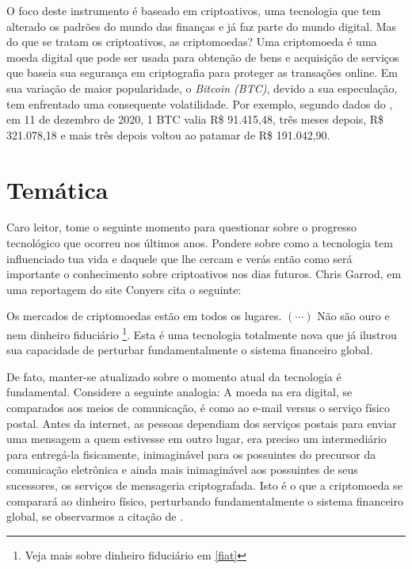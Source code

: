 O foco deste instrumento é baseado em criptoativos, uma tecnologia que tem alterado os padrões do mundo das finanças e já faz parte do mundo digital. Mas do que se tratam os criptoativos, as criptomoedas? Uma criptomoeda é uma moeda digital que pode ser usada para obtenção de bens e acquisição de serviços que baseia sua segurança em  criptografia para proteger as transações online. Em sua variação de maior popularidade, o  \textit{Bitcoin (BTC)}, devido a sua especulação, tem enfrentado uma consequente volatilidade. Por exemplo, segundo dados do \cite{COINBASE}, em 11 de dezembro de 2020, 1 BTC valia R\$ 91.415,48, três meses depois, R\$ 321.078,18 e mais três depois voltou ao patamar de R\$ 191.042,90. 


\section{Temática}
Caro leitor, tome o seguinte momento para questionar sobre o progresso tecnológico que ocorreu nos últimos anos. Pondere sobre como a tecnologia tem influenciado tua vida e daquele que lhe cercam e verás então como será importante o conhecimento sobre criptoativos nos dias futuros. Chris Garrod, em uma reportagem do site Conyers cita o seguinte:  
 

\begin{citacao}
	Os mercados de criptomoedas estão em todos os lugares. $(\cdots)$ Não são ouro e nem dinheiro fiduciário \footnote{Veja mais sobre dinheiro fiduciário em \ref{fiat}}. Esta é uma tecnologia totalmente nova que já ilustrou sua capacidade de perturbar fundamentalmente o sistema financeiro global. \cite{GARROD}
	\end{citacao}

De fato, manter-se atualizado sobre o momento atual da tecnologia é fundamental. Considere a seguinte analogia:  A moeda na era digital, se comparados aos meios de comunicação, é como ao e-mail versus o serviço físico postal. Antes da internet, as pessoas dependiam dos serviços postais para enviar uma mensagem a quem estivesse em outro lugar, era preciso um intermediário para entregá-la fisicamente, inimaginável para os possuintes do precursor da comunicação eletrônica e ainda mais inimaginável aos possuintes de seus sucessores, os serviços de mensageria criptografada. Isto é o que a criptomoeda se comparará ao dinheiro físico, perturbando fundamentalmente o sistema financeiro global, se observarmos a citação de \cite{GARROD}. 

